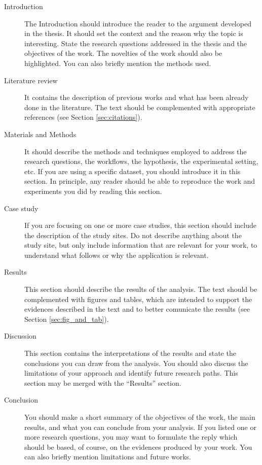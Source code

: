 \begin{description}
	\item[Introduction]
	The Introduction should introduce the reader to the argument developed in the thesis.
	It should set the context and the reason why the topic is interesting.
	State the research questions addressed in the thesis and the objectives of the work.
	The novelties of the work should also be highlighted.
	You can also briefly mention the methods used.

	\item[Literature review]
	It contains the description of previous works and what has been already done in the literature. 
	The text should be complemented with appropriate references (see Section \ref{sec:citations}). 

	\item[Materials and Methods]
	It should describe the methods and techniques employed to address the research questions, the workflows, the hypothesis, the experimental setting, etc.
	If you are using a specific dataset, you should introduce it in this section.
	In principle, any reader should be able to reproduce the work and experiments you did by reading this section.

	\item[Case study]
	If you are focusing on one or more case studies, this section should include the description of the study sites.
	Do not describe anything about the study site, but only include information that are relevant for your work, to understand what follows or why the application is relevant.

	\item[Results]
	This section should describe the results of the analysis.
	The text should be complemented with figures and tables, which are intended to support the evidences described in the text and to better comunicate the results (see Section \ref{sec:fig_and_tab}).

	\item[Discussion]
	This section contains the interpretations of the results and state the conclusions you can draw from the analysis.
	You should also discuss the limitations of your approach and identify future research paths.
	This section may be merged with the \enquote{Results} section.

	\item[Conclusion]
	You should make a short summary of the objectives of the work, the main results, and what you can conclude from your analysis.
	If you listed one or more research questions, you may want to formulate the reply which should be based, of course, on the evidences produced by your work.
	You can also briefly mention limitations and future works. 
\end{description}


